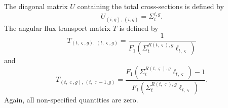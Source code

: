 The diagonal matrix $U$ containing the total cross-sections is defined by
\begin{equation}
U_{\left(i, g\right), \, \left(i, g\right)} = \Sigma_t^{i,g}.
\label{eqn:total-xs-matrix}
\end{equation}
The angular flux transport matrix $T$ is defined by
\begin{equation}
T_{\left(t,\varsigma,g\right), \, \left(t, \varsigma, g\right)} = \frac{1}{F_1\left(\Sigma_{t}^{R(t,\varsigma),g} \ell_{t,\varsigma}\right)}
\label{eqn:angular-flux-transport-matrix-1}
\end{equation}
and
\begin{equation}
T_{\left(t,\varsigma,g\right), \, \left(t, \varsigma-1, g\right)} = \frac{F_1\left(\Sigma_{t}^{R(t,\varsigma),g} \ell_{t,\varsigma}\right) - 1}{F_1\left(\Sigma_{t}^{R(t,\varsigma),g} \ell_{t,\varsigma}\right)}.
\label{eqn:angular-flux-transport-matrix-2}
\end{equation}
Again, all non-specified quantities are zero.

